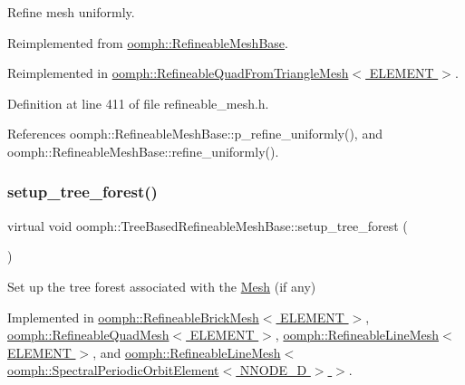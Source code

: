 Refine mesh uniformly. 



Reimplemented from \hyperlink{classoomph_1_1RefineableMeshBase_aa96201d241ce05bb33bce687632470be}{oomph\+::\+Refineable\+Mesh\+Base}.



Reimplemented in \hyperlink{classoomph_1_1RefineableQuadFromTriangleMesh_a73e88bb8c1cc8464f079e928e89a4a14}{oomph\+::\+Refineable\+Quad\+From\+Triangle\+Mesh$<$ E\+L\+E\+M\+E\+N\+T $>$}.



Definition at line 411 of file refineable\+\_\+mesh.\+h.



References oomph\+::\+Refineable\+Mesh\+Base\+::p\+\_\+refine\+\_\+uniformly(), and oomph\+::\+Refineable\+Mesh\+Base\+::refine\+\_\+uniformly().

\mbox{\label{classoomph_1_1TreeBasedRefineableMeshBase_aab7cbaa680b2258f2b1eea5de6bbe605}} 
\subsubsection{\texorpdfstring{setup\+\_\+tree\+\_\+forest()}{setup\_tree\_forest()}}
{\footnotesize\ttfamily virtual void oomph\+::\+Tree\+Based\+Refineable\+Mesh\+Base\+::setup\+\_\+tree\+\_\+forest (\begin{DoxyParamCaption}{ }\end{DoxyParamCaption})\hspace{0.3cm}{\ttfamily [pure virtual]}}



Set up the tree forest associated with the \hyperlink{classoomph_1_1Mesh}{Mesh} (if any) 



Implemented in \hyperlink{classoomph_1_1RefineableBrickMesh_afdb7af23886c1088ce9dcc855028fb84}{oomph\+::\+Refineable\+Brick\+Mesh$<$ E\+L\+E\+M\+E\+N\+T $>$}, \hyperlink{classoomph_1_1RefineableQuadMesh_ae3fed75707aa829323aeaf25ac343247}{oomph\+::\+Refineable\+Quad\+Mesh$<$ E\+L\+E\+M\+E\+N\+T $>$}, \hyperlink{classoomph_1_1RefineableLineMesh_a11ee25cace35f302fdf64b623906ea35}{oomph\+::\+Refineable\+Line\+Mesh$<$ E\+L\+E\+M\+E\+N\+T $>$}, and \hyperlink{classoomph_1_1RefineableLineMesh_a11ee25cace35f302fdf64b623906ea35}{oomph\+::\+Refineable\+Line\+Mesh$<$ oomph\+::\+Spectral\+Periodic\+Orbit\+Element$<$ N\+N\+O\+D\+E\+\_\+D $>$ $>$}.



